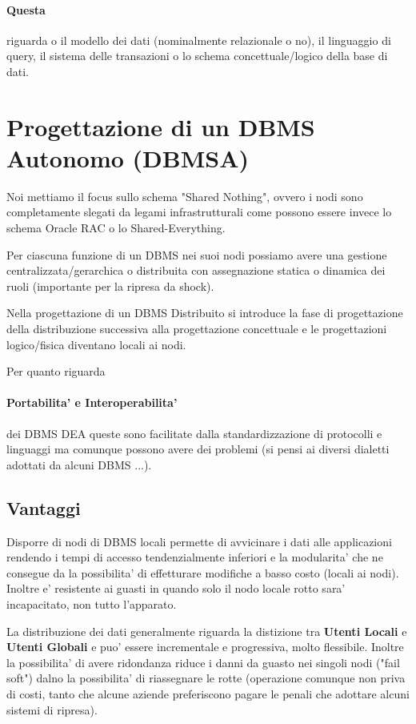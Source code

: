 \paragraph{Questa} riguarda o il modello dei dati (nominalmente relazionale o no), il linguaggio di query, il sistema delle transazioni o lo schema concettuale/logico della base di dati.

\section{Progettazione di un DBMS Autonomo (DBMSA)}

Noi mettiamo il focus sullo schema "Shared Nothing", ovvero i nodi sono completamente slegati da legami infrastrutturali come possono essere invece lo schema Oracle RAC o lo Shared-Everything.


Per ciascuna funzione di un DBMS nei suoi nodi possiamo avere una gestione centralizzata/gerarchica o distribuita con assegnazione statica o dinamica dei ruoli (importante per la ripresa da shock).

Nella progettazione di un DBMS Distribuito si introduce la fase di progettazione della distribuzione successiva alla progettazione concettuale e le progettazioni logico/fisica diventano locali ai nodi.

Per quanto riguarda \paragraph{Portabilita' e Interoperabilita'} dei DBMS DEA queste sono facilitate dalla standardizzazione di protocolli e linguaggi ma comunque possono avere dei problemi (si pensi ai diversi dialetti adottati da alcuni DBMS ...).

\subsection{Vantaggi}

Disporre di nodi di DBMS locali permette di avvicinare i dati alle applicazioni rendendo i tempi di accesso tendenzialmente inferiori e la modularita' che ne consegue da la possibilita' di effetturare modifiche a basso costo (locali ai nodi).
Inoltre e' resistente ai guasti in quando solo il nodo locale rotto sara' incapacitato, non tutto l'apparato.

La distribuzione dei dati generalmente riguarda la distizione tra \textbf{Utenti Locali} e \textbf{Utenti Globali} e puo' essere incrementale e progressiva, molto flessibile.
Inoltre la possibilita' di avere ridondanza riduce i danni da guasto nei singoli nodi ("fail soft") dalno la possibilita' di riassegnare le rotte (operazione comunque non priva di costi, tanto che alcune aziende preferiscono pagare le penali che adottare alcuni sistemi di ripresa).

